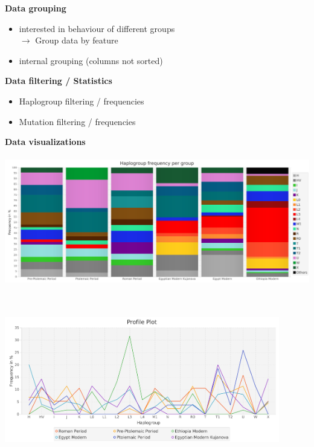 \documentclass[a0paper,portrait, fontscale=0.285]{baposter}
\begin{document}
\begin{poster}
{\begin{minipage}[t]{0.5\textwidth}
\textbf{	Data grouping}
	\begin{itemize}[leftmargin=*]
		\item interested in behaviour of different groups\\
		$\rightarrow$ Group data by feature
		\item internal grouping (columns not sorted)
	\end{itemize}
\end{minipage}
\hspace{0.5em}
\begin{minipage}[t]{0.5\textwidth}
\textbf{Data filtering / Statistics}
	\begin{itemize}[leftmargin=*]
		\item Haplogroup filtering / frequencies
		\item Mutation filtering / frequencies
	\end{itemize}
\end{minipage}

\vspace{1em}

\begin{minipage}[t]{0.5\textwidth}
\textbf{Data visualizations}\\
\\
		\includegraphics[width=\textwidth, left]{figures/stackedBarchart.png}
\end{minipage}
\hspace{0.5em}
\begin{minipage}[t]{0.5\textwidth}
\textbf{}\\
\\
		\includegraphics[width=0.9\textwidth, left]{figures/profile.png}
\end{minipage}

}
\end{poster}
\end{document}
